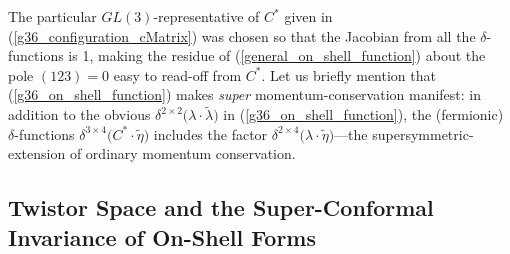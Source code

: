 \documentclass[12pt,hyperref,compress]{JHEP3}
\begin{document}
{The particular $GL(3)$-representative of $C^*$ given in (\ref{g36_configuration_cMatrix}) was chosen so that the Jacobian from all the $\delta$-functions is 1, making the residue of (\ref{general_on_shell_function}) about the pole $(123)=0$ easy to read-off from $C^*$. Let us briefly mention that (\ref{g36_on_shell_function}) makes {\it super} momentum-conservation manifest: in addition to the obvious $\delta^{2\times2}\big(\lambda\!\cdot\!\widetilde\lambda\big)$ in (\ref{g36_on_shell_function}), the (fermionic) $\delta$-functions $\delta^{3\times4}\!\big(C^*\!\cdot\widetilde\eta\big)$ includes the factor $\delta^{2\times4}\big(\lambda\cdot\widetilde\eta\big)$---the supersymmetric-extension of ordinary momentum conservation.



\subsection{Twistor Space and the Super-Conformal Invariance of On-Shell Forms}\label{twistor_space_and_super_conformal_invariance_subsection}

}
\end{document}
